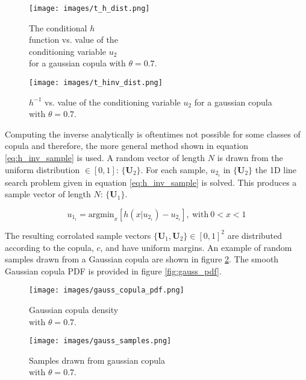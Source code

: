 \begin{figure}[!htbp]
\centering
\begin{minipage}{.45\textwidth}
  \texttt{[image: images/t\_h\_dist.png]}
\caption{The conditional $h$ \\ function vs. value of the \\ conditioning variable $u_2$ \\ for a gaussian copula with $\theta=0.7$.}
\label{fig:gauss_h}
\end{minipage}%
\begin{minipage}{.45\textwidth}
  \texttt{[image: images/t\_hinv\_dist.png]}
\caption{$h^{-1}$ vs. value of the conditioning variable $u_2$ for a gaussian copula with $\theta=0.7$.\\}
\label{fig:gauss_hinv}
\end{minipage}
\end{figure}

Computing the inverse analytically is oftentimes not possible for some classes of copula and therefore, the more general method shown in equation \ref{eq:h_inv_sample} is used.
A random vector of length $N$ is drawn from the uniform distribution $\in [0, 1]$:  $\{\mathbf U_2\}$.  For each sample, $u_{2_i}$ in $\{\mathbf U_2\}$ the 1D line search problem given in equation \ref{eq:h_inv_sample} is solved.  This produces a sample vector of length $N$: $\{\mathbf U_1\}$.

\begin{equation}
u_{1_i} = \mathrm{argmin}_{x} \left[ h(x|u_{2_i}) - u_{2_i} \right],\ \mathrm{with}\ 0 < x < 1
\label{eq:h_inv_sample}
\end{equation}

The resulting corrolated sample vectors $\{\mathbf U_1, \mathbf U_2\} \in [0,1]^2$ are distributed according to the copula, $c$, and have uniform margins.  An example of random samples drawn from a Gaussian copula are shown in figure \ref{fig:gauss_samples}.  The smooth Gaussian copula PDF is provided in figure \ref{fig:gauss_pdf}.

\begin{figure}[!htbp]
\centering
\begin{minipage}{.45\textwidth}
  \texttt{[image: images/gauss\_copula\_pdf.png]}
\caption{Gaussian copula density\\ with $\theta=0.7$.}
\label{fig:gauss_pdf}
\end{minipage}%
\begin{minipage}{.45\textwidth}
  \texttt{[image: images/gauss\_samples.png]}
\caption{Samples drawn from gaussian copula\\ with $\theta=0.7$.}
\label{fig:gauss_samples}
\end{minipage}
\end{figure}

